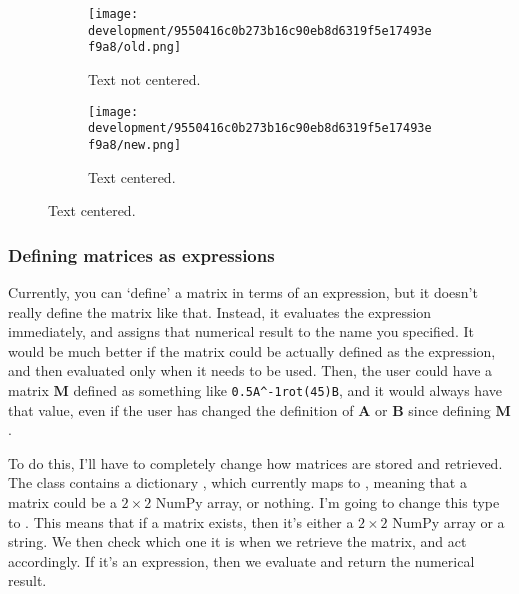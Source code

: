 \documentclass[../development.tex]{subfiles}
\begin{document}

\begin{figure}[H]
	\hspace{0.05\linewidth}
	\centering
	\begin{minipage}{0.35\linewidth}
		\centering
		\begin{figure}[H]
			\centering
			\texttt{[image: development/9550416c0b273b16c90eb8d6319f5e17493ef9a8/old.png]}
			\caption{Text not centered.}
			\label{fig:development:9550416c0b273b16c90eb8d6319f5e17493ef9a8:old.png}
		\end{figure}
	\end{minipage}%
	\hspace{0.2\linewidth}
	\begin{minipage}{0.35\linewidth}
		\centering
		\begin{figure}[H]
			\centering
			\texttt{[image: development/9550416c0b273b16c90eb8d6319f5e17493ef9a8/new.png]}
			\caption{Text centered.}
			\label{fig:development:9550416c0b273b16c90eb8d6319f5e17493ef9a8:new.png}
		\end{figure}
	\end{minipage}
	\hspace{0.05\linewidth}
	\vspace{-1em}
\end{figure}

\subsubsection{Defining matrices as expressions\label{development:fixing-bugs-and-adding-polish:defining-matrices-as-expressions}}

Currently, you can \enquote*{define} a matrix in terms of an expression, but it doesn't really define the matrix like that. Instead, it evaluates the expression immediately, and assigns that numerical result to the name you specified. It would be much better if the matrix could be actually defined as the expression, and then evaluated only when it needs to be used. Then, the user could have a matrix $\mathbf{M}$ defined as something like \texttt{0.5A\^{}-1rot(45)B}, and it would always have that value, even if the user has changed the definition of $\mathbf{A}$ or $\mathbf{B}$ since defining $\mathbf{M}$.

To do this, I'll have to completely change how matrices are stored and retrieved. The  class contains a dictionary , which currently maps  to , meaning that a matrix could be a $2 \times 2$ NumPy array, or nothing. I'm going to change this type to . This means that if a matrix exists, then it's either a $2 \times 2$ NumPy array or a string. We then check which one it is when we retrieve the matrix, and act accordingly. If it's an expression, then we evaluate and return the numerical result.
\end{document}
